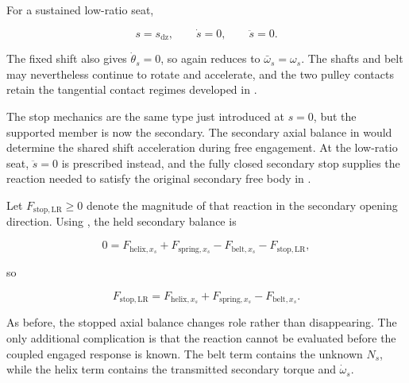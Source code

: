 \documentclass[11pt]{report}
\numberwithin{equation}{section}
\begin{document}
For a sustained low-ratio seat,

\begin{equation}
    s=s_{\mathrm{dz}},
    \qquad
    \dot s=0,
    \qquad
    \ddot s=0.
    \label{eq:low_ratio_seat_kinematics}
\end{equation}

The fixed shift also gives \(\dot\theta_s=0\), so
 again reduces to
\(\bar\omega_s=\omega_s\). The shafts and belt may nevertheless continue to
rotate and accelerate, and the two pulley contacts retain the tangential
contact regimes developed in .

The stop mechanics are the same type just introduced at \(s=0\), but the
supported member is now the secondary. The secondary axial balance in
 would determine the shared
shift acceleration during free engagement. At the low-ratio seat,
\(\ddot s=0\) is prescribed instead, and the fully closed secondary stop
supplies the reaction needed to satisfy the original secondary free body in
.

Let \(F_{\mathrm{stop,LR}}\geq0\) denote the magnitude of that reaction in the
secondary opening direction. Using
, the
held secondary balance is

\begin{equation}
    0
    =
    F_{\mathrm{helix},x_s}
    +
    F_{\mathrm{spring},x_s}
    -
    F_{\mathrm{belt},x_s}
    -
    F_{\mathrm{stop,LR}},
    \label{eq:low_ratio_stop_balance}
\end{equation}

so

\begin{equation}
    F_{\mathrm{stop,LR}}
    =
    F_{\mathrm{helix},x_s}
    +
    F_{\mathrm{spring},x_s}
    -
    F_{\mathrm{belt},x_s}.
    \label{eq:low_ratio_stop_reaction}
\end{equation}

As before, the stopped axial balance changes role rather than disappearing.
The only additional complication is that the reaction cannot be evaluated
before the coupled engaged response is known. The belt term contains the
unknown \(N_s\), while the helix term contains the transmitted secondary
torque and \(\dot\omega_s\).
\end{document}
